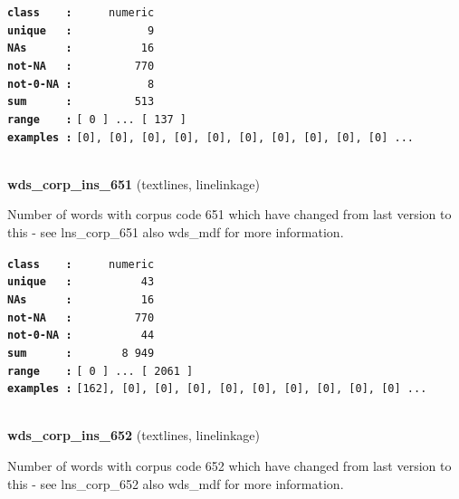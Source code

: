 \documentclass[]{article}
\begin{document}
\textbf{\texttt{class\ \ \ \ :}} \texttt{~~~~~numeric}\\
\textbf{\texttt{unique\ \ \ :}} \texttt{~~~~~~~~~~~9}\\
\textbf{\texttt{NAs\ \ \ \ \ \ :}} \texttt{~~~~~~~~~~16}\\
\textbf{\texttt{not-NA\ \ \ :}} \texttt{~~~~~~~~~770}\\
\textbf{\texttt{not-0-NA\ :}} \texttt{~~~~~~~~~~~8}\\
\textbf{\texttt{sum\ \ \ \ \ \ :}} \texttt{~~~~~~~~~513}\\
\textbf{\texttt{range\ \ \ \ :}}
\texttt{{[}\ 0\ {]}\ ...\ {[}\ 137\ {]}}\\
\textbf{\texttt{examples\ :}}
\texttt{{[}0{]},\ {[}0{]},\ {[}0{]},\ {[}0{]},\ {[}0{]},\ {[}0{]},\ {[}0{]},\ {[}0{]},\ {[}0{]},\ {[}0{]}\ ...}\\

~

\textbf{wds\_corp\_ins\_651} (textlines, linelinkage)

Number of words with corpus code 651 which have changed from last
version to this - see lns\_corp\_651 also wds\_mdf for more information.

\textbf{\texttt{class\ \ \ \ :}} \texttt{~~~~~numeric}\\
\textbf{\texttt{unique\ \ \ :}} \texttt{~~~~~~~~~~43}\\
\textbf{\texttt{NAs\ \ \ \ \ \ :}} \texttt{~~~~~~~~~~16}\\
\textbf{\texttt{not-NA\ \ \ :}} \texttt{~~~~~~~~~770}\\
\textbf{\texttt{not-0-NA\ :}} \texttt{~~~~~~~~~~44}\\
\textbf{\texttt{sum\ \ \ \ \ \ :}} \texttt{~~~~~~~8~949}\\
\textbf{\texttt{range\ \ \ \ :}}
\texttt{{[}\ 0\ {]}\ ...\ {[}\ 2061\ {]}}\\
\textbf{\texttt{examples\ :}}
\texttt{{[}162{]},\ {[}0{]},\ {[}0{]},\ {[}0{]},\ {[}0{]},\ {[}0{]},\ {[}0{]},\ {[}0{]},\ {[}0{]},\ {[}0{]}\ ...}\\

~

\textbf{wds\_corp\_ins\_652} (textlines, linelinkage)

Number of words with corpus code 652 which have changed from last
version to this - see lns\_corp\_652 also wds\_mdf for more information.
\end{document}
